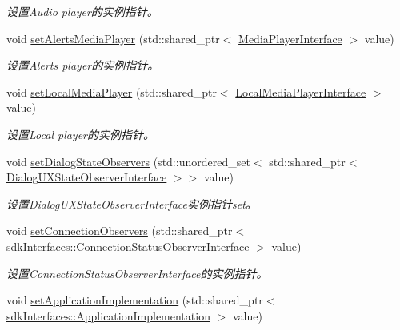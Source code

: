 \begin{DoxyCompactItemize}
\begin{DoxyCompactList}\small\item\em 设置\+Audio player的实例指针。 \end{DoxyCompactList}\item 
void \hyperlink{structduerOSDcsSDK_1_1sdkInterfaces_1_1DcsSdkParameters_a08fd79d632571c5e943fd85196ba0411}{set\+Alerts\+Media\+Player} (std\+::shared\+\_\+ptr$<$ \hyperlink{classduerOSDcsSDK_1_1sdkInterfaces_1_1MediaPlayerInterface}{Media\+Player\+Interface} $>$ value)
\begin{DoxyCompactList}\small\item\em 设置\+Alerts player的实例指针。 \end{DoxyCompactList}\item 
void \hyperlink{structduerOSDcsSDK_1_1sdkInterfaces_1_1DcsSdkParameters_a02a6263c432994bf0acb036e4ed6d7c7}{set\+Local\+Media\+Player} (std\+::shared\+\_\+ptr$<$ \hyperlink{classduerOSDcsSDK_1_1sdkInterfaces_1_1LocalMediaPlayerInterface}{Local\+Media\+Player\+Interface} $>$ value)
\begin{DoxyCompactList}\small\item\em 设置\+Local player的实例指针。 \end{DoxyCompactList}\item 
void \hyperlink{structduerOSDcsSDK_1_1sdkInterfaces_1_1DcsSdkParameters_ad2b64e3b8c64580ea28c7699e6fa7d74}{set\+Dialog\+State\+Observers} (std\+::unordered\+\_\+set$<$ std\+::shared\+\_\+ptr$<$ \hyperlink{classduerOSDcsSDK_1_1sdkInterfaces_1_1DialogUXStateObserverInterface}{Dialog\+U\+X\+State\+Observer\+Interface} $>$$>$ value)
\begin{DoxyCompactList}\small\item\em 设置\+Dialog\+U\+X\+State\+Observer\+Interface实例指针set。 \end{DoxyCompactList}\item 
void \hyperlink{structduerOSDcsSDK_1_1sdkInterfaces_1_1DcsSdkParameters_a82391d394920edd2cdce280c111021b4}{set\+Connection\+Observers} (std\+::shared\+\_\+ptr$<$ \hyperlink{classduerOSDcsSDK_1_1sdkInterfaces_1_1ConnectionStatusObserverInterface}{sdk\+Interfaces\+::\+Connection\+Status\+Observer\+Interface} $>$ value)
\begin{DoxyCompactList}\small\item\em 设置\+Connection\+Status\+Observer\+Interface的实例指针。 \end{DoxyCompactList}\item 
void \hyperlink{structduerOSDcsSDK_1_1sdkInterfaces_1_1DcsSdkParameters_a4560432cd5e52eb3aed9f40dba480ac3}{set\+Application\+Implementation} (std\+::shared\+\_\+ptr$<$ \hyperlink{classduerOSDcsSDK_1_1sdkInterfaces_1_1ApplicationImplementation}{sdk\+Interfaces\+::\+Application\+Implementation} $>$ value)
$$
\end{DoxyCompactItemize}
